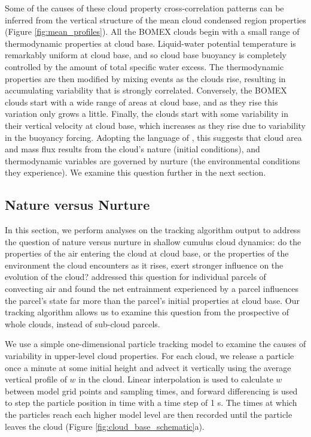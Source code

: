 \documentclass[acp]{copernicus}
\begin{document}
Some of the causes of these cloud property cross-correlation patterns can be 
inferred from the vertical structure of the mean cloud condensed region 
properties (Figure \ref{fig:mean_profiles}).  All the BOMEX clouds begin with 
a small range of thermodynamic properties at cloud base.  Liquid-water 
potential temperature is remarkably uniform at cloud base, and so cloud base 
buoyancy is completely controlled by the amount of total specific water excess.
The thermodynamic properties are then modified by mixing events as the clouds 
rise, resulting in accumulating variability that is strongly correlated.  
Conversely, the BOMEX clouds start with a wide range of areas at cloud base, 
and as they rise this variation only grows a little.  Finally, the clouds start 
with some variability in their vertical velocity at cloud base, which increases 
as they rise due to variability in the buoyancy forcing.  Adopting the language 
of \cite{Romps2010}, this suggests that cloud area and mass flux results from 
the cloud's nature (initial conditions), and thermodynamic variables are 
governed by nurture (the environmental conditions they experience).  We examine 
this question further in the next section.

\subsection{Nature versus Nurture}

In this section, we perform analyses on the tracking algorithm output to 
address the question of nature versus nurture in shallow cumulus cloud 
dynamics: do the properties of the air entering the cloud at cloud base, or the 
properties of the environment the cloud encounters as it rises, exert stronger 
influence on the evolution of the cloud?  \cite{Romps2010} addressed this 
question for individual parcels of convecting air and found the net entrainment 
experienced by a parcel influences the parcel's state far more than the 
parcel's initial properties at cloud base.  Our tracking algorithm allows us to 
examine this question from the prospective of whole clouds, instead of 
sub-cloud parcels.

We use a simple one-dimensional particle tracking model to examine the causes 
of variability in upper-level cloud properties.  For each cloud, we release a 
particle once a minute at some initial height and advect it vertically using 
the average vertical profile of $w$ in the cloud.  Linear interpolation is 
used to calculate $w$ between model grid points and sampling times, and forward 
differencing is used to step the particle position in time with a time step of 
1 s.  The times at which the particles reach each higher model level are then 
recorded until the particle leaves the cloud (Figure 
\ref{fig:cloud_base_schematic}a).  
\end{document}
